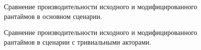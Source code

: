 \begin{figure}[H]
    \begin{center}
    \end{center}

    \caption{Сравнение производительности исходного и модифицированного рантаймов в основном сценарии.}
    \label{fig:tatlin:multi_rt_gp:eval}
\end{figure}

\begin{figure}[H]
    \begin{center}
    \end{center}

    \caption{Сравнение производительности исходного и модифицированного рантаймов в сценарии с тривиальными акторами.}
    \label{fig:tatlin:rt_gp_spawn:eval}
\end{figure}

